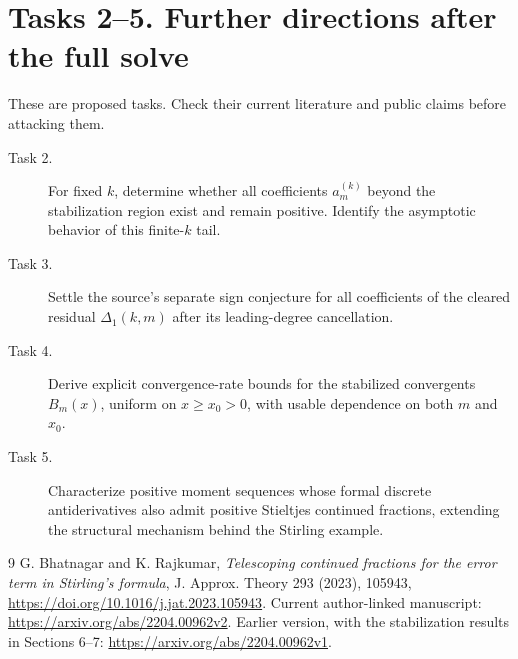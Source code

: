 \documentclass[11pt]{article}
\begin{document}
\section*{Tasks 2--5. Further directions after the full solve}
These are proposed tasks. Check their current literature and public
claims before attacking them.
\begin{description}
\item[Task 2.] For fixed \(k\), determine whether all coefficients
\(a_m^{(k)}\) beyond the stabilization region exist and remain positive.
Identify the asymptotic behavior of this finite-\(k\) tail.
\item[Task 3.] Settle the source's separate sign conjecture for all
coefficients of the cleared residual \(\Delta_1(k,m)\) after its
leading-degree cancellation.
\item[Task 4.] Derive explicit convergence-rate bounds for the
stabilized convergents \(B_m(x)\), uniform on \(x\geq x_0>0\),
with usable dependence on both \(m\) and \(x_0\).
\item[Task 5.] Characterize positive moment sequences whose formal
discrete antiderivatives also admit positive Stieltjes
continued fractions, extending the structural mechanism behind
the Stirling example.
\end{description}

\begin{thebibliography}{9}
G. Bhatnagar and K. Rajkumar,
\emph{Telescoping continued fractions for the error term in Stirling's formula},
J. Approx. Theory 293 (2023), 105943,
\url{https://doi.org/10.1016/j.jat.2023.105943}.
Current author-linked manuscript:
\url{https://arxiv.org/abs/2204.00962v2}.
Earlier version, with the stabilization results in Sections 6--7:
\url{https://arxiv.org/abs/2204.00962v1}.
\end{thebibliography}
\end{document}
